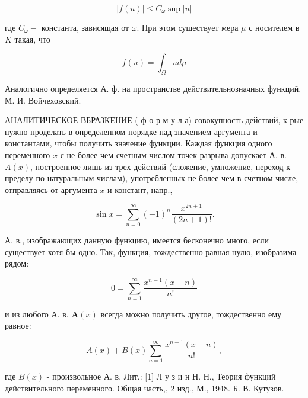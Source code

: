 \documentclass[10pt]{article}
\begin{document}
\[

|f(u)| \leqslant C_{\omega} \sup |u|

\]



где $C_{\omega}-$ константа, зависящая от $\omega$. При этом существует мера $\mu$ с носителем в $K$ такая, что



\[

f(u)=\int_{\Omega} u d \mu

\]



Аналогично определяется А. ф. на пространстве действительнозначных функций. М. И. Войчеховский.



АНАЛИТИЧЕСКОЕ ВБРАЗКЕНИЕ ( $ф$ о р м у л а) совокупность действий, к-рые нужно проделать в определенном порядке над значением аргумента и константами, чтобы получить значение функции. Каждая функция одного переменного $x$ с не более чем счетным числом точек разрыва допускает А. в. $A(x)$, построенное лишь из трех действий (сложение, умножение, переход к пределу по натуральным числам), употребленных не более чем в счетном числе, отправляясь от аргумента $x$ и констант, напр.,



\[

\sin x=\sum_{n=0}^{\infty}(-1)^{n} \frac{x^{2 n+1}}{(2 n+1) !} .

\]



А. в., изображающих данную функцию, имеется бесконечно много, если существует хотя бы одно. Так, функция, тождественно равная нулю, изобразима рядом:



\[

0=\sum_{n=1}^{\infty} \frac{x^{n-1}(x-n)}{n !}

\]



и из любого А. в. $\boldsymbol{A}(x)$ всегда можно получить другое, тождественно ему равное:



\[

A(x)+B(x) \sum_{n=1}^{\infty} \frac{x^{n-1}(x-n)}{n !},

\]



где $B(x)$ - произвольное А. в. Лит.: [1] Л у з и н Н. Н., Теория функций действительного переменного. Общая часть,, 2 изд., М., 1948. Б. В. Кутузов.
\end{document}
